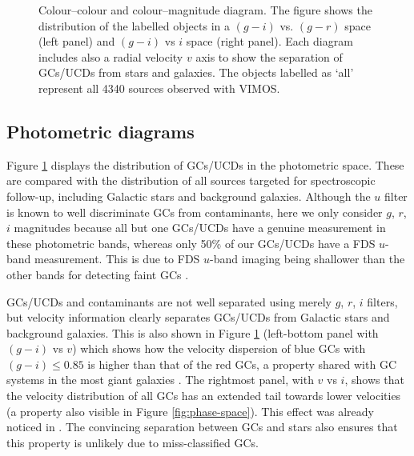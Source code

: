 \documentclass[useAMS,usenatbib]{mn2e}
\begin{document}
\begin{figure}
\caption{Colour--colour and colour--magnitude diagram. 
The figure shows the 
distribution of the labelled objects in a $(g-i)$ vs. $(g-r)$ space (left 
panel) and $(g-i)$ vs $i$ space (right panel). Each diagram includes also a 
radial velocity $v$ axis to show the separation of GCs/UCDs from stars and 
galaxies. The objects labelled as `all' represent all 4340 sources observed with VIMOS.
}
\label{fig:cc}
\end{figure}

\subsection{Photometric diagrams}


Figure \ref{fig:cc} displays the distribution of GCs/UCDs in the photometric 
space. These are compared with the distribution of all sources targeted for 
spectroscopic follow-up, including Galactic stars and background galaxies. 
Although the $u$ filter is known to well discriminate GCs from contaminants, 
here we only consider $g$, $r$, $i$ magnitudes because all but one GCs/UCDs 
have a genuine measurement in these photometric bands, whereas only 50\% of our 
GCs/UCDs have a FDS $u$-band measurement. This is due to FDS $u$-band imaging being 
shallower than the other bands for detecting faint GCs \citep{DAbrusco16}.

GCs/UCDs and contaminants are not well separated using merely $g$, $r$, $i$ 
filters, but velocity information clearly separates GCs/UCDs from Galactic 
stars and background galaxies. This is also shown in Figure \ref{fig:cc} 
(left-bottom panel with $(g-i)$ vs $v$) which shows how the velocity 
dispersion of blue GCs with $(g-i) \le 0.85$ is higher than that of the red GCs, a 
property shared with GC systems in the most giant galaxies \citep[e.g.,][]{Pota13}. 
The rightmost panel, with $v$ vs $i$, shows that 
the velocity distribution of all GCs has an extended tail towards lower velocities (a 
property also visible in Figure \ref{fig:phase-space}). This effect was already 
noticed in \citet{Schuberth}. The convincing separation between GCs and stars 
also ensures that this property is unlikely due to miss-classified GCs. 
\end{document}
